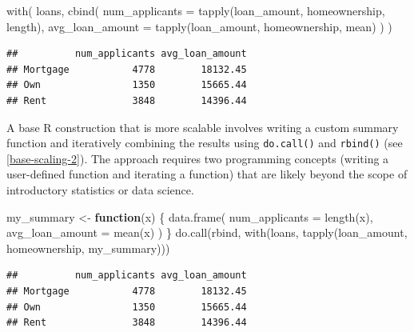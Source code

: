 \documentclass[12pt]{article}
\newenvironment{Shaded}{\begin{snugshade}}{\end{snugshade}}
\newcommand{\AttributeTok}[1]{\textcolor[rgb]{0.77,0.63,0.00}{#1}}
\newcommand{\ControlFlowTok}[1]{\textcolor[rgb]{0.13,0.29,0.53}{\textbf{#1}}}
\newcommand{\FunctionTok}[1]{\textcolor[rgb]{0.00,0.00,0.00}{#1}}
\newcommand{\NormalTok}[1]{#1}
\newcommand{\OtherTok}[1]{\textcolor[rgb]{0.56,0.35,0.01}{#1}}
\begin{document}
\linespread{1}

\begin{Shaded}
\begin{Highlighting}[]
\FunctionTok{with}\NormalTok{(}
\NormalTok{  loans, }
  \FunctionTok{cbind}\NormalTok{(}
    \AttributeTok{num\_applicants =} \FunctionTok{tapply}\NormalTok{(loan\_amount, homeownership, length),}
    \AttributeTok{avg\_loan\_amount =} \FunctionTok{tapply}\NormalTok{(loan\_amount, homeownership, mean)}
\NormalTok{  )}
\NormalTok{)}
\end{Highlighting}
\end{Shaded}

\begin{verbatim}
##          num_applicants avg_loan_amount
## Mortgage           4778        18132.45
## Own                1350        15665.44
## Rent               3848        14396.44
\end{verbatim}


\label{base-scaling-1} \linespread{2}
\vspace{3mm}\setlength{\parindent}{15pt}

A base R construction that is more scalable involves writing a custom
summary function and iteratively combining the results using
\texttt{do.call()} and \texttt{rbind()} (see \ref{base-scaling-2}). The
approach requires two programming concepts (writing a user-defined
function and iterating a function) that are likely beyond the scope of
introductory statistics or data science.

\linespread{1}

\begin{Shaded}
\begin{Highlighting}[]
\NormalTok{my\_summary }\OtherTok{\textless{}{-}} \ControlFlowTok{function}\NormalTok{(x) \{ }
  \FunctionTok{data.frame}\NormalTok{(}
    \AttributeTok{num\_applicants =} \FunctionTok{length}\NormalTok{(x),}
    \AttributeTok{avg\_loan\_amount =} \FunctionTok{mean}\NormalTok{(x)}
\NormalTok{  )}
\NormalTok{\}}
\FunctionTok{do.call}\NormalTok{(rbind, }\FunctionTok{with}\NormalTok{(loans, }\FunctionTok{tapply}\NormalTok{(loan\_amount, homeownership, my\_summary)))}
\end{Highlighting}
\end{Shaded}

\begin{verbatim}
##          num_applicants avg_loan_amount
## Mortgage           4778        18132.45
## Own                1350        15665.44
## Rent               3848        14396.44
\end{verbatim}
\end{document}
